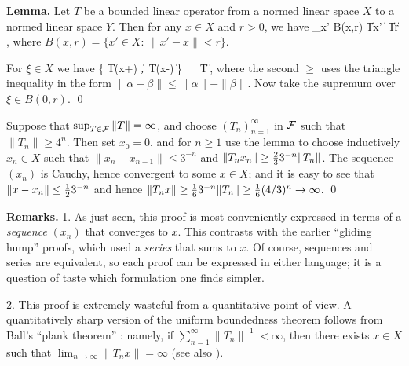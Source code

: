 \documentclass[12pt]{article}
\begin{document}
\bigskip

{\bf Lemma.}   Let $T$ be a bounded linear operator
from a normed linear space $X$ to a normed linear space $Y$.
Then for any $x \in X$ and $r > 0$, we have
\be
   \sup\limits_{x' \in B(x,r)} \| Tx' \| \;\ge\; \|T\| r  \;,
\ee
where $B(x,r) = \{x' \in X \colon\: \|x'-x\| < r \}$.

\smallskip

\proof
For $\xi \in X$ we have
\be
   \max\bigl\{ \| T(x+\xi) \| ,\, \| T(x-\xi) \| \bigr\}
   \;\,\ge\;\,
   \smhalf \bigl[ \| T(x+\xi) \| + \| T(x-\xi) \| \bigr]
   \;\,\ge\;\,
   \| T \xi \|  \;,
   \quad
\ee
where the second $\ge$ uses the triangle inequality
in the form $\| \alpha-\beta \| \le \|\alpha\| + \|\beta\|$.
Now take the supremum over $\xi \in B(0,r)$.
\qed

\vspace*{-4mm}

Suppose that $\sup_{T \in {\mathcal{F}}} \|T\| = \infty$,
and choose $(T_n)_{n=1}^\infty$ in ${\mathcal{F}}$ such that $\|T_n\| \ge 4^n$.
Then set $x_0 = 0$, and for $n \ge 1$ use the lemma to
choose inductively $x_n \in X$
such that $\| x_n - x_{n-1} \| \le 3^{-n}$
and $\| T_n x_n \| \ge {\textstyle{2\over 3}} 3^{-n} \| T_n \|$.
The sequence $(x_n)$ is Cauchy, hence convergent to some $x \in X$;
and it is easy to see that
$\| x-x_n \| \le {\textstyle{1\over 2}} 3^{-n}$ and hence
$\| T_n x \| \ge {\textstyle{1\over 6}} 3^{-n} \| T_n \| \ge {\textstyle{1\over 6}} (4/3)^n
 \to \infty$.
\qed

\medskip

{\bf Remarks.}
1.  As just seen, this proof is most conveniently expressed in terms of a
{\em sequence}\/ $(x_n)$ that converges to $x$.
This contrasts with the earlier ``gliding hump'' proofs,
which used a {\em series}\/ that sums to $x$.
Of course, sequences and series are equivalent,
so each proof can be expressed in either language;
it is a question of taste which formulation one finds simpler.

2.  This proof is extremely wasteful from a quantitative point of view.
A quantitatively sharp version of the uniform boundedness theorem
follows from Ball's ``plank theorem'' \cite{Ball_91}:
namely, if $\sum_{n=1}^\infty \|T_n\|^{-1} < \infty$,
then there exists $x \in X$ such that
$\lim_{n\to\infty} \| T_n x \| = \infty$
(see also \cite{Muller_09}).
\end{document}
